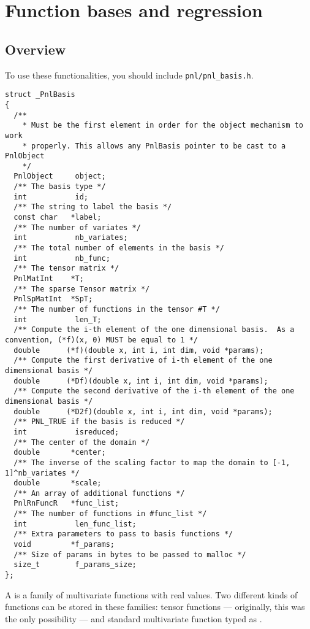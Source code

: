 \section{Function bases and regression}
\subsection{Overview}

To use these functionalities, you should include \verb!pnl/pnl_basis.h!.

\begin{lstlisting}
struct _PnlBasis
{
  /**
    * Must be the first element in order for the object mechanism to work
    * properly. This allows any PnlBasis pointer to be cast to a PnlObject
    */
  PnlObject     object;
  /** The basis type */
  int           id;
  /** The string to label the basis */
  const char   *label;
  /** The number of variates */
  int           nb_variates;
  /** The total number of elements in the basis */
  int           nb_func;
  /** The tensor matrix */
  PnlMatInt    *T;
  /** The sparse Tensor matrix */
  PnlSpMatInt  *SpT;
  /** The number of functions in the tensor #T */
  int           len_T;
  /** Compute the i-th element of the one dimensional basis.  As a convention, (*f)(x, 0) MUST be equal to 1 */
  double      (*f)(double x, int i, int dim, void *params);
  /** Compute the first derivative of i-th element of the one dimensional basis */
  double      (*Df)(double x, int i, int dim, void *params);
  /** Compute the second derivative of the i-th element of the one dimensional basis */
  double      (*D2f)(double x, int i, int dim, void *params);
  /** PNL_TRUE if the basis is reduced */
  int           isreduced;
  /** The center of the domain */
  double       *center;
  /** The inverse of the scaling factor to map the domain to [-1, 1]^nb_variates */
  double       *scale;
  /** An array of additional functions */
  PnlRnFuncR   *func_list;
  /** The number of functions in #func_list */
  int           len_func_list;
  /** Extra parameters to pass to basis functions */
  void         *f_params;
  /** Size of params in bytes to be passed to malloc */
  size_t        f_params_size; 
};
\end{lstlisting}

A  is a family of multivariate functions with real values. Two different kinds of functions can be stored in these families: tensor functions --- originally, this was the only possibility --- and standard multivariate function typed as .

